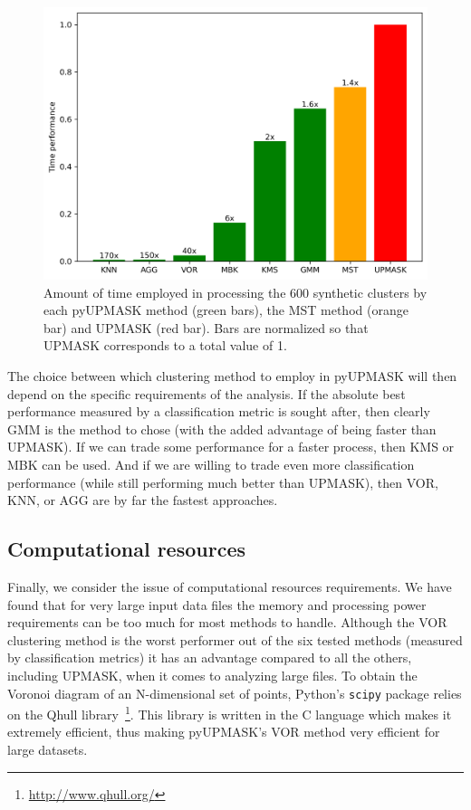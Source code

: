 \documentclass{aa}
\begin{document}
 \begin{figure}
  \centering
  \includegraphics[width=\hsize]{figs/time_analysis.png}
  \caption{Amount of time employed in processing the 600 synthetic
  clusters by each pyUPMASK method (green bars), the MST method (orange bar)
  and UPMASK (red bar). Bars are normalized so that UPMASK corresponds to a
  total value of 1.}
  \label{fig:timeanalys}
 \end{figure}

 The choice between which clustering method to employ in pyUPMASK will then
 depend on the specific requirements of the analysis. If the absolute best
 performance measured by a classification metric is sought after, then clearly
 GMM is the method to chose (with the added advantage of being faster than
 UPMASK). If we can trade some performance for a faster
 process, then KMS or MBK can be used. And if we are willing to trade even more
 classification performance (while still performing much better than UPMASK),
 then VOR, KNN, or AGG are by far the fastest approaches.





\subsection{Computational resources}
 \label{ssec:vor_ngc2516}

 Finally, we consider the issue of computational resources requirements.
 We have found that for very large input data files the memory and
 processing power requirements can be too much for most methods to handle.
 Although the VOR clustering method is the worst performer out of the six
 tested methods (measured by classification metrics) it has an advantage
 compared to all the others, including UPMASK, when it comes to analyzing large
 files. 
 To obtain the Voronoi diagram of an N-dimensional set of points, Python's 
 \texttt{scipy} package relies on the Qhull
 library~\citep{Barber_1996}\footnote{\url{http://www.qhull.org/}}.
 This library is written in the C language which makes it extremely efficient,
 thus making pyUPMASK's VOR method very efficient for large datasets.
\end{document}
